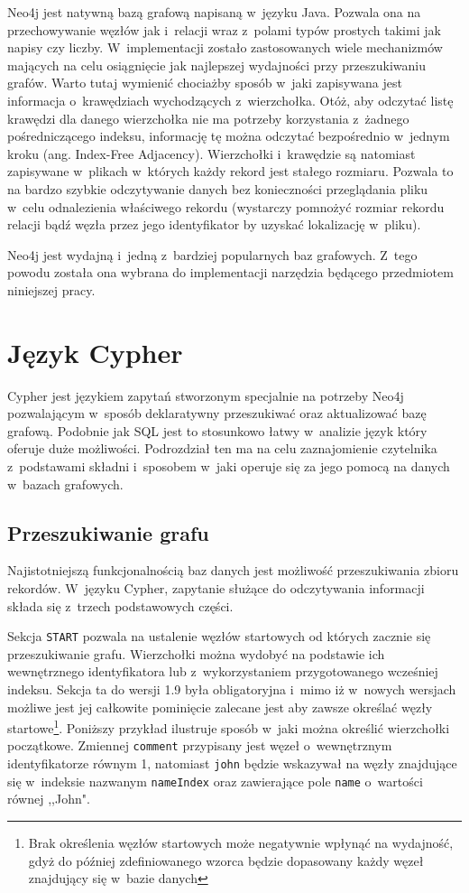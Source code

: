 \documentclass[brudnopis]{xmgr}
\begin{document}
Neo4j jest natywną bazą grafową napisaną w~języku Java. Pozwala ona na przechowywanie węzłów jak i~relacji wraz z~polami typów prostych takimi jak napisy czy liczby. W~implementacji zostało zastosowanych wiele mechanizmów mających na celu osiągnięcie jak najlepszej wydajności przy przeszukiwaniu grafów. Warto tutaj wymienić chociażby sposób w~jaki zapisywana jest informacja o~krawędziach wychodzących z~wierzchołka. Otóż, aby odczytać listę krawędzi dla danego wierzchołka nie ma potrzeby korzystania z~żadnego pośredniczącego indeksu, informację tę można odczytać bezpośrednio w~jednym kroku (ang. Index-Free Adjacency\cite[s.~5]{Robinson:2013:GD}). Wierzchołki i~krawędzie są natomiast zapisywane w~plikach w~których każdy rekord jest stałego rozmiaru. Pozwala to na bardzo szybkie odczytywanie danych bez konieczności przeglądania pliku w~celu odnalezienia właściwego rekordu (wystarczy pomnożyć rozmiar rekordu relacji bądź węzła przez jego identyfikator by uzyskać lokalizację w~pliku).

Neo4j jest wydajną i~jedną z~bardziej popularnych baz grafowych. Z~tego powodu została ona wybrana do implementacji narzędzia będącego przedmiotem niniejszej pracy.

\section{Język Cypher}
Cypher jest językiem zapytań stworzonym specjalnie na potrzeby Neo4j pozwalającym w~sposób deklaratywny przeszukiwać oraz aktualizować bazę grafową. Podobnie jak SQL jest to stosunkowo łatwy w~analizie język który oferuje duże możliwości. Podrozdział ten ma na celu zaznajomienie czytelnika z~podstawami składni i~sposobem w~jaki operuje się za jego pomocą na danych w~bazach grafowych.

\subsection{Przeszukiwanie grafu}

Najistotniejszą funkcjonalnością baz danych jest możliwość przeszukiwania zbioru rekordów. W~języku Cypher, zapytanie służące do odczytywania informacji składa się z~trzech podstawowych części.

Sekcja \texttt{START} pozwala na ustalenie węzłów startowych od których zacznie się przeszukiwanie grafu. Wierzchołki można wydobyć na podstawie ich wewnętrznego identyfikatora lub z~wykorzystaniem przygotowanego wcześniej indeksu. Sekcja ta do wersji 1.9 była obligatoryjna i~mimo iż w~nowych wersjach możliwe jest jej całkowite pominięcie zalecane jest aby zawsze określać węzły startowe\footnote{Brak określenia węzłów startowych może negatywnie wpłynąć na wydajność, gdyż do później zdefiniowanego wzorca będzie dopasowany każdy węzeł znajdujący się w~bazie danych}. Poniższy przykład ilustruje sposób w~jaki można określić wierzchołki początkowe. Zmiennej \texttt{comment} przypisany jest węzeł o~wewnętrznym identyfikatorze równym 1, natomiast \texttt{john} będzie wskazywał na węzły znajdujące się w~indeksie nazwanym \texttt{nameIndex} oraz zawierające pole \texttt{name} o~wartości równej ,,John".
\end{document}
